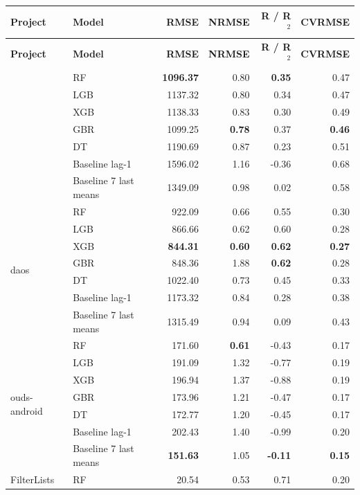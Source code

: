 \documentclass{article}
\begin{document}
\scriptsize
\setlength{\tabcolsep}{2pt}
\renewcommand{\arraystretch}{0.85}
\begin{longtable}{ll rrrr}
\toprule
\textbf{Project} & \textbf{Model} & \textbf{RMSE} & \textbf{NRMSE} & \textbf{R / R$^2$} & \textbf{CVRMSE} \\
\midrule
\endfirsthead
\toprule
\textbf{Project} & \textbf{Model} & \textbf{RMSE} & \textbf{NRMSE} & \textbf{R / R$^2$} & \textbf{CVRMSE} \\
\midrule
\endhead
\bottomrule
\endfoot
\multirow{7}{*}{radare2} & RF & \textbf{1096.37} & 0.80 & \textbf{0.35} & 0.47 \\
 & LGB & 1137.32 & 0.80 & 0.34 & 0.47 \\
 & XGB & 1138.33 & 0.83 & 0.30 & 0.49 \\
 & GBR & 1099.25 & \textbf{0.78} & 0.37 & \textbf{0.46} \\
 & DT & 1190.69 & 0.87 & 0.23 & 0.51 \\
 & Baseline lag-1 & 1596.02 & 1.16 & -0.36 & 0.68 \\
 & Baseline 7 last means & 1349.09 & 0.98 & 0.02 & 0.58 \\
\midrule
\multirow{7}{*}{daos} & RF & 922.09 & 0.66 & 0.55 & 0.30 \\
 & LGB & 866.66 & 0.62 & 0.60 & 0.28 \\
 & XGB & \textbf{844.31} & \textbf{0.60} & \textbf{0.62} & \textbf{0.27} \\
 & GBR & 848.36 & 1.88 & \textbf{0.62} & 0.28 \\
 & DT & 1022.40 & 0.73 & 0.45 & 0.33 \\
 & Baseline lag-1 & 1173.32 & 0.84 & 0.28 & 0.38 \\
 & Baseline 7 last means & 1315.49 & 0.94 & 0.09 & 0.43 \\
\midrule
\multirow{7}{*}{ouds-android} & RF & 171.60 & \textbf{0.61} & -0.43 & 0.17 \\
 & LGB & 191.09 & 1.32 & -0.77 & 0.19 \\
 & XGB & 196.94 & 1.37 & -0.88 & 0.19 \\
 & GBR & 173.96 & 1.21 & -0.47 & 0.17 \\
 & DT & 172.77 & 1.20 & -0.45 & 0.17 \\
 & Baseline lag-1 & 202.43 & 1.40 & -0.99 & 0.20 \\
 & Baseline 7 last means & \textbf{151.63} & 1.05 & \textbf{-0.11} & \textbf{0.15} \\
\midrule
\multirow{7}{*}{FilterLists} & RF & 20.54 & 0.53 & 0.71 & 0.20 \\

\end{longtable}
\end{document}
